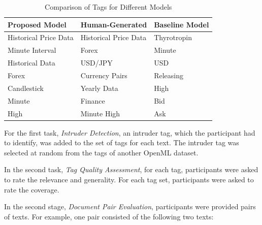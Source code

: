 \begin{table}[h]
    \centering
    \begin{tabular}{|>{\raggedright\arraybackslash}p{4cm}|>{\raggedright\arraybackslash}p{4cm}|>{\raggedright\arraybackslash}p{4cm}|}
        \hline
        \textbf{Proposed Model} & \textbf{Human-Generated} & \textbf{Baseline Model} \\ \hline
        Historical Price Data   & Historical Price Data    & Thyrotropin             \\ \hline
        Minute Interval         & Forex                    & Minute                  \\ \hline
        Historical Data         & USD/JPY                  & USD                     \\ \hline
        Forex                   & Currency Pairs           & Releasing               \\ \hline
        Candlestick             & Yearly Data              & High                    \\ \hline
        Minute                  & Finance                  & Bid                     \\ \hline
        High                    & Minute High              & Ask                     \\ \hline
    \end{tabular}
    \caption{Comparison of Tags for Different Models}
    \label{tab:tag_comparison}
\end{table}

For the first task, \textit{Intruder Detection}, an intruder tag, which the participant had to identify, was added to the set of tags for each text. The intruder tag was selected at random from the tags of another OpenML dataset.

In the second task, \textit{Tag Quality Assessment}, for each tag, participants were asked to rate the relevance and generality. For each tag set, participants were asked to rate the coverage.

In the second stage, \textit{Document Pair Evaluation}, participants were provided pairs of texts. For example, one pair consisted of the following two texts:

